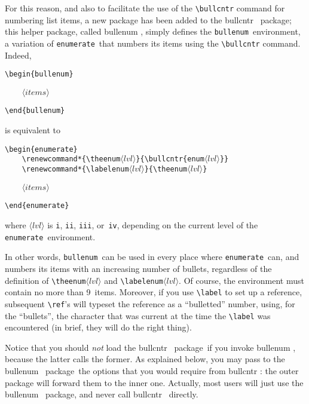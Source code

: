 \documentclass[a4paper]{article}
\DeclareRobustCommand*{\packlass}[1]{%
	{\texorpdfstring{\normalfont \sffamily}{}#1}%
}
\DeclareRobustCommand*{\meta}[1]{\mbox{\(\langle\textit{#1}\rangle\)}}
\DeclareRobustCommand*{\env}[1]{\texttt{#1}}
\newcommand*{\Bullcntr}{bullcntr}
\newcommand*{\bull}{\packlass{\Bullcntr}}
\newcommand*{\tbull}{the \bull\ package}
\newcommand*{\Bullenum}{bullenum}
\newcommand*{\benu}{\packlass{\Bullenum}}
\newcommand*{\tbenu}{the \benu\ package}
\newcommand*{\Enumerat}{enumerate}
\newcommand*{\beenv}{\env{\Bullenum}}
\newcommand*{\enenv}{\env{\Enumerat}}
\begin{document}
For this reason, and also to facilitate the use of the
\verb|\bullcntr| command for numbering list items, a new package has
been added to \tbull; this helper package, called \benu, simply
defines the \beenv\ environment, a variation of \enenv\ that numbers
its items using the \verb|\bullcntr| command.  Indeed,
%
\begin{verbatim}
\begin{bullenum}
\end{verbatim}
\begin{flushleft}
	\texttt{\ \ \ \ }\meta{items}
\end{flushleft}
\begin{verbatim}
\end{bullenum}
\end{verbatim}
%
is equivalent to
\begin{flushleft}
	\verb|\begin{enumerate}|\\
	\verb|    \renewcommand*{\theenum|\meta{lvl}\verb|}{\bullcntr{enum|\meta{lvl}\verb|}}|\\
	\verb|    \renewcommand*{\labelenum|\meta{lvl}\verb|}{\theenum|\meta{lvl}\verb|}|
\end{flushleft}
\begin{flushleft}
	\texttt{\ \ \ \ }\meta{items}\\[\topsep]
\end{flushleft}
\begin{verbatim}
\end{enumerate}
\end{verbatim}
%
where \meta{lvl} is \texttt{i}, \texttt{ii}, \texttt{iii},
or~\texttt{iv}, depending on the current level of the \enenv\
environment.

In other words, \beenv\ can be used in every place where \enenv\ can,
and numbers its items with an increasing number of bullets, regardless
of the definition of \verb|\theenum|\meta{lvl} and
\verb|\labelenum|\meta{lvl}.  Of course, the environment must contain
no more than 9~items.  Moreover, if you use \verb|\label| to set up a
reference, subsequent \verb|\ref|'s will typeset the reference as a
``bulletted'' number, using, for the ``bullets'', the character that
was current at the time the \verb|\label| was encountered (in brief,
they will do the right thing).

Notice that you should \emph{not} load \tbull\ if you invoke \benu,
because the latter calls the former.  As explained below, you may pass
to \tbenu\ the options that you would require from \bull: the outer
package will forward them to the inner one.  Actually, most users will
just use \tbenu, and never call \bull\ directly.
\end{document}
